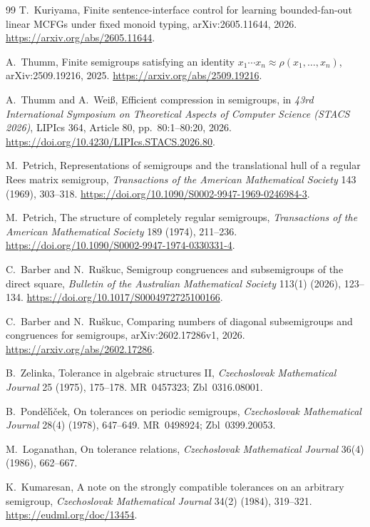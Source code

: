 \documentclass[10pt,a4paper]{ltjsarticle}
\theoremstyle{definition}
\theoremstyle{remark}
\begin{document}
\begin{thebibliography}{99}
T.~Kuriyama,
\newblock Finite sentence-interface control for learning bounded-fan-out linear MCFGs under fixed monoid typing,
\newblock arXiv:2605.11644, 2026.
\newblock \url{https://arxiv.org/abs/2605.11644}.

A.~Thumm,
\newblock Finite semigroups satisfying an identity
\(x_1\cdots x_n\approx\rho(x_1,\ldots,x_n)\),
\newblock arXiv:2509.19216, 2025.
\newblock \url{https://arxiv.org/abs/2509.19216}.

A.~Thumm and A.~Wei\ss,
\newblock Efficient compression in semigroups,
\newblock in \emph{43rd International Symposium on Theoretical Aspects of
Computer Science (STACS 2026)}, LIPIcs 364, Article 80, pp.~80:1--80:20,
2026.
\newblock \url{https://doi.org/10.4230/LIPIcs.STACS.2026.80}.

M.~Petrich,
\newblock Representations of semigroups and the translational hull of a
regular Rees matrix semigroup,
\newblock \emph{Transactions of the American Mathematical Society}
143 (1969), 303--318.
\newblock \url{https://doi.org/10.1090/S0002-9947-1969-0246984-3}.



M.~Petrich,
\newblock The structure of completely regular semigroups,
\newblock \emph{Transactions of the American Mathematical Society}
189 (1974), 211--236.
\newblock \url{https://doi.org/10.1090/S0002-9947-1974-0330331-4}.



C.~Barber and N.~Ru\v{s}kuc,
\newblock Semigroup congruences and subsemigroups of the direct square,
\newblock \emph{Bulletin of the Australian Mathematical Society}
113(1) (2026), 123--134.
\newblock \url{https://doi.org/10.1017/S0004972725100166}.


C.~Barber and N.~Ru\v{s}kuc,
\newblock Comparing numbers of diagonal subsemigroups and congruences for semigroups,
\newblock arXiv:2602.17286v1, 2026.
\newblock \url{https://arxiv.org/abs/2602.17286}.

B.~Zelinka,
\newblock Tolerance in algebraic structures II,
\newblock \emph{Czechoslovak Mathematical Journal} 25 (1975), 175--178.
\newblock MR~0457323; Zbl~0316.08001.

B.~Pond\v{e}l\'\i\v{c}ek,
\newblock On tolerances on periodic semigroups,
\newblock \emph{Czechoslovak Mathematical Journal} 28(4) (1978), 647--649.
\newblock MR~0498924; Zbl~0399.20053.

M.~Loganathan,
\newblock On tolerance relations,
\newblock \emph{Czechoslovak Mathematical Journal} 36(4) (1986), 662--667.

K.~Kumaresan,
\newblock A note on the strongly compatible tolerances on an arbitrary semigroup,
\newblock \emph{Czechoslovak Mathematical Journal} 34(2) (1984), 319--321.
\newblock \url{https://eudml.org/doc/13454}.

\end{thebibliography}
\end{document}
